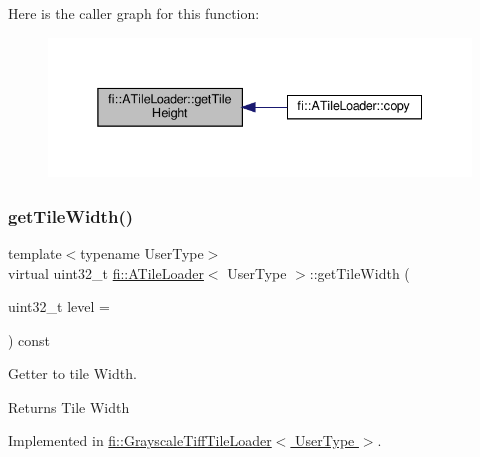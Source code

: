 Here is the caller graph for this function\+:
\nopagebreak
\begin{figure}[H]
\begin{center}
\leavevmode
\includegraphics[width=338pt]{dc/d54/classfi_1_1ATileLoader_a531ceb7c73457fdde7055e95abd777fa_icgraph}
\end{center}
\end{figure}
\mbox{\label{classfi_1_1ATileLoader_ad4ced663628b4134fd8f7bb0cfd2a652}} 
\subsubsection{\texorpdfstring{get\+Tile\+Width()}{getTileWidth()}}
{\footnotesize\ttfamily template$<$typename User\+Type$>$ \\
virtual uint32\+\_\+t \hyperlink{classfi_1_1ATileLoader}{fi\+::\+A\+Tile\+Loader}$<$ User\+Type $>$\+::get\+Tile\+Width (\begin{DoxyParamCaption}\item[{uint32\+\_\+t}]{level = {} }\end{DoxyParamCaption}) const\hspace{0.3cm}{\ttfamily [pure virtual]}}



Getter to tile Width. 

\begin{DoxyReturn}{Returns}
Tile Width 
\end{DoxyReturn}


Implemented in \hyperlink{classfi_1_1GrayscaleTiffTileLoader_a273613b0ebb48732c449399fac614ebd}{fi\+::\+Grayscale\+Tiff\+Tile\+Loader$<$ User\+Type $>$}.

